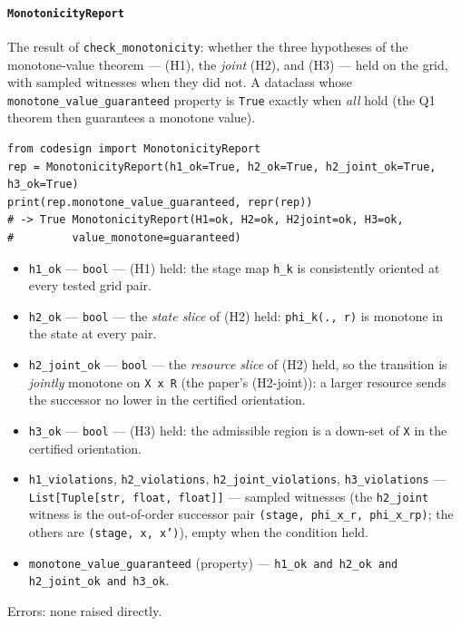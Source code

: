 \documentclass[11pt,a4paper]{article}
\begin{document}
\paragraph{\texttt{MonotonicityReport}}\label{ref:sequential:monotonicityreport}
The result of \texttt{check\_monotonicity}: whether the three hypotheses of
the monotone-value theorem --- (H1), the \emph{joint} (H2), and (H3) --- held
on the grid, with sampled witnesses when they did not. A dataclass whose
\texttt{monotone\_\allowbreak value\_\allowbreak guaranteed} property is
\texttt{True} exactly when \emph{all} hold (the Q1 theorem then guarantees a
monotone value).
\begin{lstlisting}
from codesign import MonotonicityReport
rep = MonotonicityReport(h1_ok=True, h2_ok=True, h2_joint_ok=True, h3_ok=True)
print(rep.monotone_value_guaranteed, repr(rep))
# -> True MonotonicityReport(H1=ok, H2=ok, H2joint=ok, H3=ok,
#         value_monotone=guaranteed)
\end{lstlisting}
\begin{itemize}[nosep]
  \item \texttt{h1\_ok} --- \texttt{bool} --- (H1) held: the stage map
    \texttt{h\_k} is consistently oriented at every tested grid pair.
  \item \texttt{h2\_ok} --- \texttt{bool} --- the \emph{state slice} of (H2)
    held: \texttt{phi\_k(.,\ r)} is monotone in the state at every pair.
  \item \texttt{h2\_joint\_ok} --- \texttt{bool} --- the \emph{resource
    slice} of (H2) held, so the transition is \emph{jointly} monotone on
    \texttt{X x R} (the paper's (H2-joint)): a larger resource sends the
    successor no lower in the certified orientation.
  \item \texttt{h3\_ok} --- \texttt{bool} --- (H3) held: the admissible
    region is a down-set of \texttt{X} in the certified orientation.
  \item \texttt{h1\_violations}, \texttt{h2\_violations},
    \texttt{h2\_joint\_violations}, \texttt{h3\_violations} ---
    \texttt{List[Tuple[str, float, float]]} --- sampled witnesses (the
    \texttt{h2\_joint} witness is the out-of-order successor pair
    \texttt{(stage, phi\_x\_r, phi\_x\_rp)}; the others are
    \texttt{(stage, x, x')}), empty when the condition held.
  \item \texttt{monotone\_value\_guaranteed} (property) ---
    \texttt{h1\_ok and h2\_ok and h2\_joint\_ok and h3\_ok}.
\end{itemize}
Errors: none raised directly.
\end{document}
